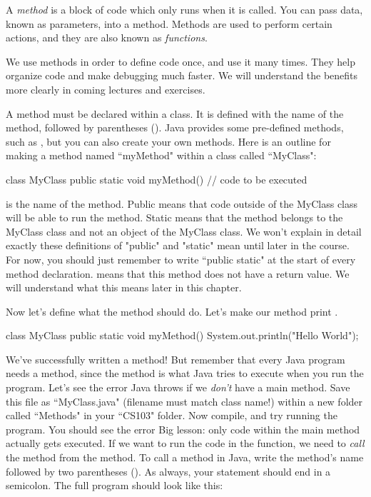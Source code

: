 A \emph{method} is a block of code which only runs when it is called. You can pass data, known as parameters, into a method. Methods are used to perform certain actions, and they are also known as \emph{functions}.

We use methods in order to define code once, and use it many times. They help organize code and make debugging much faster. We will understand the benefits more clearly in coming lectures and exercises. 

A method must be declared within a class. It is defined with the name of the method, followed by parentheses (). Java provides some pre-defined methods, such as , but you can also create your own methods. Here is an outline for making a method named ``myMethod" within a class called ``MyClass": 

\begin{code}
class MyClass {
  public static void myMethod() {
    // code to be executed
  }
}
\end{code}

 is the name of the method. Public means that code outside of the MyClass class will be able to run the method. Static means that the method belongs to the MyClass class and not an object of the MyClass class. We won't explain in detail exactly these definitions of "public" and "static" mean until later in the course. For now, you should just remember to write ``public static" at the start of every method declaration.  means that this method does not have a return value. We will understand what this means later in this chapter. 

Now let's define what the method should do. Let's make our method print . 
\begin{code}
class MyClass {
  public static void myMethod() {
    System.out.println("Hello World");
  }
}
\end{code}

We've successfully written a method! But remember that every Java program needs a  method, since the  method is what Java tries to execute when you run the program. Let's see the error Java throws if we \emph{don't} have a main method. Save this file as ``MyClass.java" (filename must match class name!) within a new folder called ``Methods" in your ``CS103" folder. Now compile, and try running the program. You should see the error  Big lesson: only code within the main method actually gets executed. If we want to run the code in the  function, we need to \emph{call} the  method from the  method. To call a method in Java, write the method's name followed by two parentheses (). As always, your statement should end in a semicolon. The full program should look like this: 

